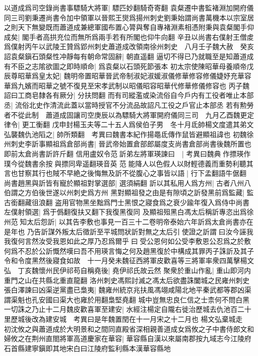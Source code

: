 以道成爲司空錄尚書事驃騎大將軍|{
	驃匹妙翻騎奇寄翻}
袁粲遷中書監褚淵加開府儀同三司劉秉遷尚書令加中領軍以晉熙王爕爲揚州刺史劉秉始謂尚書萬機本以宗室居之則天下無變既而蕭道成兼總軍國布置心膂與奪自專褚淵素相憑附秉與袁粲閣手仰成矣|{
	閣手者高拱充位而無所爲兩手若有所閣也仰牛向翻}
辛丑以尚書右僕射王僧䖍爲僕射丙午以武陵王贊爲郢州刺史蕭道成改領南徐州刺史　八月壬子魏大赦　癸亥詔袁粲鎭石頭粲性冲靜每有朝命常固辭|{
	朝直遥翻}
逼切不得已乃就職至是知蕭道成有不臣之志隂欲圖之即時順命|{
	爲袁粲以石頭死節張本}
初太宗使陳昭華母養順帝戊辰尊昭華爲皇太妃|{
	魏明帝置昭華晉武帝制淑妃淑媛淑儀修華修容修儀婕妤充華容華爲九嬪而昭華之號不復見至宋孝武制以昭儀昭容昭華代修華修儀修容也}
丙子魏詔曰工商皂隸各有厥分|{
	分扶問翻}
而有司縱濫或染流俗自今戶内有工役者唯止本部丞|{
	流俗北史作清流此蓋以當時授官不分流品故詔凡工役之戶官止本部丞}
若有勲勞者不從此制　蕭道成固讓司空庚辰以為驃騎大將軍開府儀同三司　九月乙酉魏更定律令|{
	更工衡翻}
戊申封楊玉夫等二十五人爲侯伯子男　冬十月氐帥楊文度遣其弟文弘襲魏仇池䧟之|{
	帥所類翻　考異曰魏書本紀作揚黽氐傳作鼠皆避顯祖諱也}
初魏徐州刺史李訢事顯祖爲倉部尚書|{
	晉武帝始置倉部郎屬度支尚書倉部尚書後魏所置也即前太倉尚書訢許斤翻}
信用盧奴令范訢弟左將軍瑛諫曰　|{
	考異曰魏典作摽瑛作璞今從魏書余按與摽同卑遥翻瑛音英}
范能降人以色假人以財輕德義而重勢利聽其言也甘察其行也賊不早絶之後悔無及訢不從腹心之事皆以語|{
	行下孟翻語牛倨翻}
尚書趙黑與訢皆有寵於顯祖對掌選部|{
	選須絹翻}
訢以其私用人爲方州|{
	古者八州八伯謂之方伯後世遂以州刺史爲方州}
黑對顯祖發之由是有隙頃之訢發黑前爲監藏|{
	監古銜翻藏徂浪翻}
盗用官物黑坐黜爲門士黑恨之寢食爲之衰少踰年復入爲侍中尚書左僕射領選|{
	爲于僞翻復扶又翻下我復黑復同}
及顯祖殂黑白馮太后稱訢專恣出爲徐州范知太后怨訢|{
	以其告李敷也事見一百三十二卷明帝泰始六年訢爲太倉尚書亦在是年也}
乃告訢謀外叛太后徵訢至平城問狀訢對無之太后引使證之訢謂曰汝今誣我我復何言然汝受我恩如此之厚乃忍爲爾乎曰受公恩何如公受李敷恩公忍爲之於敷何爲不忍於公訢慨然嘆曰吾不用瑛言悔之何及趙黑復於中構成其罪丙子誅訢及其子令和令度黑然後寢食如故　十一月癸未魏征西將軍皮歡喜等三將軍率衆四萬擊楊文弘　丁亥魏懷州民伊祁苟自稱堯後|{
	堯伊祁氏故云然}
聚衆於重山作亂|{
	重山即河内重門之山在共縣北重直龍翻}
洛州刺史馮熙討滅之馮太后欲盡誅闔城之民雍州刺史張白澤諫曰凶渠逆黨盡已梟夷|{
	魏雍州統京兆扶風馮翊咸陽北地平秦武都等郡凶渠謂渠魁也孔安國曰渠大也雍於用翻梟堅堯翻}
城中豈無忠良仁信之士柰何不問白黑一切誅之乃止十二月魏皮歡喜軍至建安|{
	水經注楊定自隴右徙治歷城去仇池百二十里歷城後改為建安城　考異曰是年魏置閏在十一月宋之十二月也}
楊文弘棄城走　初沈攸之與蕭道成於大明景和之間同直殿省深相親善道成女爲攸之子中書侍郎文和婦攸之在荆州直閤將軍高道慶家在華容|{
	華容縣自漢以來屬南郡按九域志今江陵府石首縣建寧鎭即其地宋白曰江陵府監利縣本漢華容縣地}
